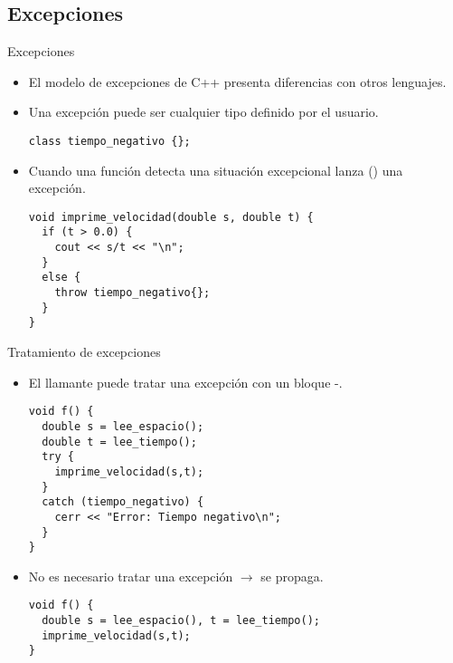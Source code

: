 \subsection{Excepciones}

\begin{frame}[t,fragile]{Excepciones}
\begin{itemize}
  \item El modelo de excepciones de C++ presenta diferencias con
        otros lenguajes.

  \pause\vfill
  \item Una excepción puede ser cualquier tipo definido por el usuario.
\begin{lstlisting}
class tiempo_negativo {};
\end{lstlisting}

  \pause\vfill
  \item Cuando una función detecta una situación excepcional lanza
        () una excepción.
\begin{lstlisting}
void imprime_velocidad(double s, double t) {
  if (t > 0.0) {
    cout << s/t << "\n";
  }
  else {
    throw tiempo_negativo{};
  }
}
\end{lstlisting}

\end{itemize}
\end{frame}

\begin{frame}[t,fragile]{Tratamiento de excepciones}
\begin{itemize}
  \item El llamante puede tratar una excepción con un bloque -.
\begin{lstlisting}
void f() {
  double s = lee_espacio();
  double t = lee_tiempo();
  try {
    imprime_velocidad(s,t);
  }
  catch (tiempo_negativo) {
    cerr << "Error: Tiempo negativo\n";
  }
}
\end{lstlisting}
  \vfill\pause
  \item No es necesario tratar una excepción $\rightarrow$ se propaga.
\begin{lstlisting}
void f() {
  double s = lee_espacio(), t = lee_tiempo();
  imprime_velocidad(s,t);
}
\end{lstlisting}
\end{itemize}
\end{frame}

